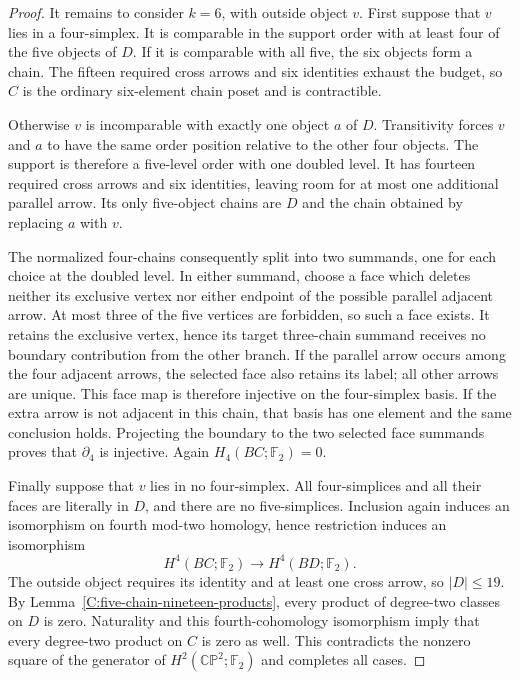 \begin{proof}
It remains to consider $k=6$, with outside object $v$.
First suppose that $v$ lies in a four-simplex.  It is
comparable in the support order with at least four of the
five objects of $D$.  If it is comparable with all five,
the six objects form a chain.  The fifteen required cross
arrows and six identities exhaust the budget, so $C$ is
the ordinary six-element chain poset and is contractible.

Otherwise $v$ is incomparable with exactly one object $a$
of $D$.  Transitivity forces $v$ and $a$ to have the same
order position relative to the other four objects.  The
support is therefore a five-level order with one doubled
level.  It has fourteen required cross arrows and six
identities, leaving room for at most one additional
parallel arrow.  Its only five-object chains are $D$ and
the chain obtained by replacing $a$ with $v$.

The normalized four-chains consequently split into two
summands, one for each choice at the doubled level.  In
either summand, choose a face which deletes neither its
exclusive vertex nor either endpoint of the possible
parallel adjacent arrow.  At most three of the five
vertices are forbidden, so such a face exists.  It retains
the exclusive vertex, hence its target three-chain summand
receives no boundary contribution from the other branch.
If the parallel arrow occurs among the four adjacent arrows,
the selected face also retains its label; all other arrows
are unique.  This face map is therefore injective on the
four-simplex basis.  If the extra arrow is not adjacent in
this chain, that basis has one element and the same conclusion
holds.  Projecting the boundary to the two selected face
summands proves that $\partial_4$ is injective.  Again
$H_4(BC;\mathbb F_2)=0$.

Finally suppose that $v$ lies in no four-simplex.  All
four-simplices and all their faces are literally in $D$,
and there are no five-simplices.  Inclusion again induces
an isomorphism on fourth mod-two homology, hence restriction
induces an isomorphism
\[
 H^4(BC;\mathbb F_2)\longrightarrow H^4(BD;\mathbb F_2).
\]
The outside object requires its identity and at least one
cross arrow, so $|D|\leq19$.  By
Lemma~\ref{C:five-chain-nineteen-products}, every product
of degree-two classes on $D$ is zero.  Naturality and this
fourth-cohomology isomorphism imply that every degree-two
product on $C$ is zero as well.  This contradicts the
nonzero square of the generator of
$H^2(\mathbb {CP}^2;\mathbb F_2)$ and completes all cases.
\end{proof}
